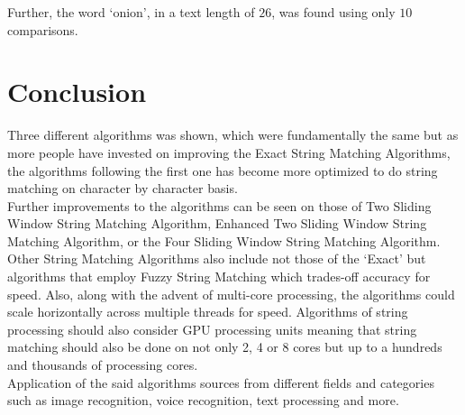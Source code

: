 Further, the word `onion', in a text length of $26$, was found using only $10$ comparisons.

\section{Conclusion}

Three different algorithms was shown, which were fundamentally the same but as more people have invested on improving the Exact String Matching Algorithms, the algorithms following the first one has become more optimized to do string matching on character by character basis.
\\
Further improvements to the algorithms can be seen on those of Two Sliding Window String Matching Algorithm, Enhanced Two Sliding Window String Matching Algorithm, or the Four Sliding Window String Matching Algorithm. Other String Matching Algorithms also include not those of the `Exact' but algorithms that employ Fuzzy String Matching which trades-off accuracy for speed. Also, along with the advent of multi-core processing, the algorithms could scale horizontally across multiple threads for speed. Algorithms of string processing should also consider GPU processing units meaning that string matching should also be done on not only 2, 4 or 8 cores but up to a hundreds and thousands of processing cores. 
\\
Application of the said algorithms sources from different fields and categories such as image recognition, voice recognition, text processing and more.
